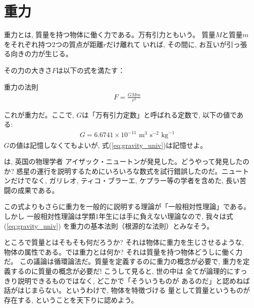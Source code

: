 \section{重力}

重力とは, 質量を持つ物体に働く力である。万有引力ともいう。
質量$M$と質量$m$をそれぞれ持つ2つの質点が距離$r$だけ離れて
いれば, その間に, お互いが引っ張る向きの力が生じる。

その力の大きさ$F$は以下の式を満たす：
\begin{itembox}{重力の法則}
\begin{eqnarray}
F=\frac{GMm}{r^2}\label{eq:gravity_univ}
\end{eqnarray}
\end{itembox}
これが重力だ。ここで, $G$は「万有引力定数」と呼ばれる定数で, 以下の値である:
\begin{eqnarray}
G=6.6741\times 10^{-11}\text{ m}^3\text{ s}^{-2}\text{ kg}^{-1}
\end{eqnarray}
$G$の値は記憶しなくてもよいが, 式(\ref{eq:gravity_univ})は記憶せよ。

は, 英国の物理学者
アイザック・ニュートンが発見した。どうやって発見したのか? 
惑星の運行を説明するためにいろいろな数式を試行錯誤したのだ。ニュートンだけでなく, 
ガリレオ, ティコ・ブラーエ, ケプラー等の学者を含めた, 長い苦闘の成果である。

この式よりもさらに重力を一般的に説明する理論が「一般相対性理論」である。しかし
一般相対性理論は学類1年生には手に負えない理論なので, 我々は式(\ref{eq:gravity_univ})
を重力の基本法則（根源的な法則）とみなそう。\mv

ところで質量とはそもそも何だろうか? それは物体に重力を生じさせるような, 
物体の属性である。では重力とは何か? それは質量を持つ物体どうしに働く力だ。
この議論は循環論法だ。質量を定義するのに重力の概念が必要で, 
重力を定義するのに質量の概念が必要だ! こうして見ると, 世の中は
全てが論理的にすっきり説明できるものではなく, どこかで「そういうものが
あるのだ」と認めねば話がはじまらない。というわけで, 物体を特徴づける
量として質量というものが存在する, ということを天下りに認めよう。\mv

